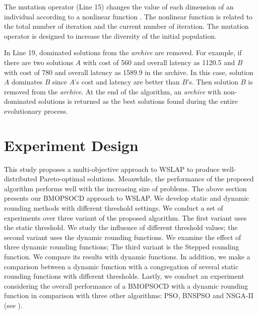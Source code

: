 \documentclass[10pt,journal,compsoc]{IEEEtran}
\begin{document}
The mutation operator (Line 15) changes the value of each dimension of an individual according to a nonlinear function \cite{1304847}. The nonlinear function is related to the total number of iteration and the current number of iteration. The mutation operator is designed to increase the diversity of the initial population.


In Line 19, dominated solutions from the \textit{archive} are removed. For example, if there are two solutions $A$ with cost of 560 and overall latency as 1120.5 and $B$ with cost of 780 and overall latency as 1589.9 in the archive. In this case, solution $A$ dominates $B$ since $A$'s cost and latency are better than $B$'s. Then solution $B$ is removed
from the \textit{archive}. At the end of the algorithm, an \textit{archive} with non-dominated
solutions is returned as the best solutions found during the entire evolutionary process.

\section{Experiment Design} \label{sec:experiment}
\label{sec:exp}

This study proposes a multi-objective approach to WSLAP to produce well-distributed Pareto-optimal solutions. Meanwhile, the performance of the proposed algorithm performs well with the increasing size of problems. 
The above section presents our BMOPSOCD approach to WSLAP. We develop static and dynamic rounding methods with different threshold settings. We conduct a set of experiments over three variant of the proposed algorithm. The first variant uses the static threshold. We study the influence of different threshold values; the second variant uses the dynamic rounding functions. We examine the effect of three dynamic rounding functions; The third variant is the Stepped rounding function. We compare its results with dynamic functions. In addition, we make a comparison between a dynamic function with a congregation of
several static rounding functions with different thresholds. 
Lastly, we conduct an experiment considering the overall performance of a BMOPSOCD with a dynamic rounding function in comparison with three other algorithms: PSO, BNSPSO and NSGA-II (see \cite{Tan2016}). 
\end{document}
